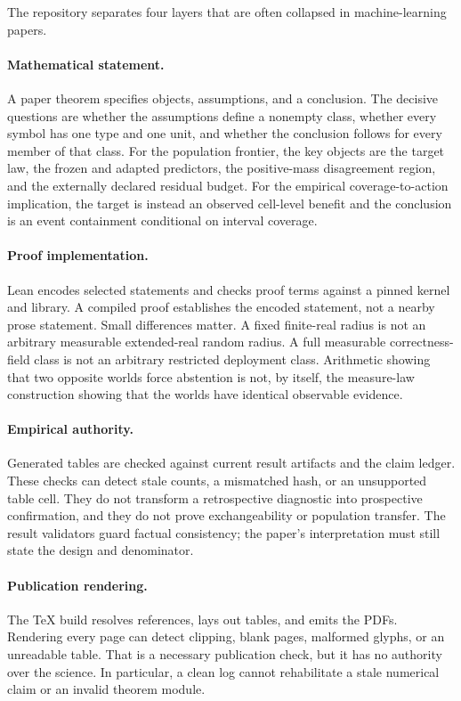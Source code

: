 The repository separates four layers that are often collapsed in machine-learning papers.

\paragraph{Mathematical statement.}
A paper theorem specifies objects, assumptions, and a conclusion.  The decisive questions are
whether the assumptions define a nonempty class, whether every symbol has one type and one unit,
and whether the conclusion follows for every member of that class.  For the population frontier,
the key objects are the target law, the frozen and adapted predictors, the positive-mass
disagreement region, and the externally declared residual budget.  For the empirical
coverage-to-action implication, the target is instead an observed cell-level benefit and the
conclusion is an event containment conditional on interval coverage.

\paragraph{Proof implementation.}
Lean encodes selected statements and checks proof terms against a pinned kernel and library.  A
compiled proof establishes the encoded statement, not a nearby prose statement.  Small differences
matter.  A fixed finite-real radius is not an arbitrary measurable extended-real random radius.
A full measurable correctness-field class is not an arbitrary restricted deployment class.
Arithmetic showing that two opposite worlds force abstention is not, by itself, the measure-law
construction showing that the worlds have identical observable evidence.

\paragraph{Empirical authority.}
Generated tables are checked against current result artifacts and the claim ledger.  These checks
can detect stale counts, a mismatched hash, or an unsupported table cell.  They do not transform a
retrospective diagnostic into prospective confirmation, and they do not prove exchangeability or
population transfer.  The result validators guard factual consistency; the paper's interpretation
must still state the design and denominator.

\paragraph{Publication rendering.}
The TeX build resolves references, lays out tables, and emits the PDFs.  Rendering every page can
detect clipping, blank pages, malformed glyphs, or an unreadable table.  That is a necessary
publication check, but it has no authority over the science.  In particular, a clean log cannot
rehabilitate a stale numerical claim or an invalid theorem module.

